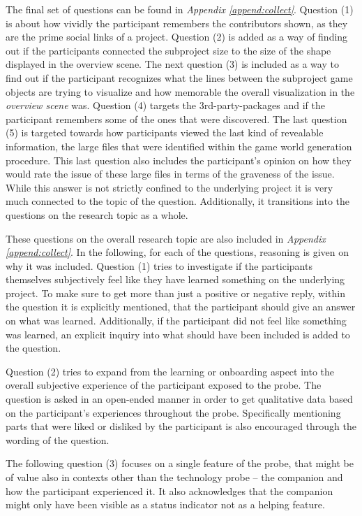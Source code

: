 The final set of questions can be found in \textit{Appendix \ref{append:collect}}. Question (1) is about how vividly the participant remembers the contributors shown, as they are the prime social links of a project. Question (2) is added as a way of finding out if the participants connected the subproject size to the size of the shape displayed in the overview scene. The next question (3) is included as a way to find out if the participant recognizes what the lines between the subproject game objects are trying to visualize and how memorable the overall visualization in the \textit{overview scene} was. Question (4) targets the 3rd-party-packages and if the participant remembers some of the ones that were discovered. The last question (5) is targeted towards how participants viewed the last kind of revealable information, the large files that were identified within the game world generation procedure. This last question also includes the participant's opinion on how they would rate the issue of these large files in terms of the graveness of the issue. While this answer is not strictly confined to the underlying project it is very much connected to the topic of the question. Additionally, it transitions into the questions on the research topic as a whole.

These questions on the overall research topic are also included in \textit{Appendix \ref{append:collect}}. In the following, for each of the questions, reasoning is given on why it was included. Question (1) tries to investigate if the participants themselves subjectively feel like they have learned something on the underlying project. To make sure to get more than just a positive or negative reply, within the question it is explicitly mentioned, that the participant should give an answer on what was learned. Additionally, if the participant did not feel like something was learned, an explicit inquiry into what should have been included is added to the question.

Question (2) tries to expand from the learning or onboarding aspect into the overall subjective experience of the participant exposed to the probe. The question is asked in an open-ended manner in order to get qualitative data based on the participant's experiences throughout the probe. Specifically mentioning parts that were liked or disliked by the participant is also encouraged through the wording of the question.

The following question (3) focuses on a single feature of the probe, that might be of value also in contexts other than the technology probe -- the companion and how the participant experienced it. It also acknowledges that the companion might only have been visible as a status indicator not as a helping feature.

